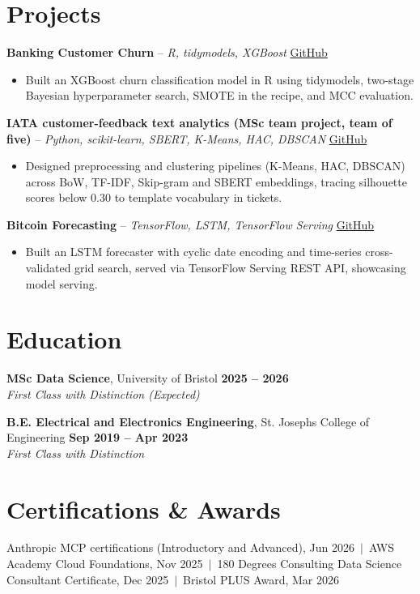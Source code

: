 \documentclass[a4paper,11pt]{article}
\begin{document}
\section{Projects}
\noindent\textbf{Banking Customer Churn} -- \textit{R, tidymodels, XGBoost} \hfill \href{https://github.com/Thiruvel-AP/Banking-Customer-Churn-Prediction}{GitHub}
\begin{itemize}
  \item Built an XGBoost churn classification model in R using tidymodels, two-stage Bayesian hyperparameter search, SMOTE in the recipe, and MCC evaluation.
\end{itemize}
\vspace{3pt}
\noindent\textbf{IATA customer-feedback text analytics (MSc team project, team of five)} -- \textit{Python, scikit-learn, SBERT, K-Means, HAC, DBSCAN} \hfill \href{https://github.com/Thiruvel-AP/TextAnalytics}{GitHub}
\begin{itemize}
  \item Designed preprocessing and clustering pipelines (K-Means, HAC, DBSCAN) across BoW, TF-IDF, Skip-gram and SBERT embeddings, tracing silhouette scores below 0.30 to template vocabulary in tickets.
\end{itemize}
\vspace{3pt}
\noindent\textbf{Bitcoin Forecasting} -- \textit{TensorFlow, LSTM, TensorFlow Serving} \hfill \href{https://github.com/Thiruvel-AP/BitcoinForecasting}{GitHub}
\begin{itemize}
  \item Built an LSTM forecaster with cyclic date encoding and time-series cross-validated grid search, served via TensorFlow Serving REST API, showcasing model serving.
\end{itemize}

\section{Education}
\textbf{MSc Data Science}, University of Bristol \hfill \textbf{2025 – 2026}\\ \textit{First Class with Distinction (Expected)}\par
\vspace{3pt}
\textbf{B.E. Electrical and Electronics Engineering}, St. Joseph\textquotesingle{}s College of Engineering \hfill \textbf{Sep 2019 – Apr 2023}\\ \textit{First Class with Distinction}\par

\section{Certifications \& Awards}
Anthropic MCP certifications (Introductory and Advanced), Jun 2026 \,$|$\, AWS Academy Cloud Foundations, Nov 2025 \,$|$\, 180 Degrees Consulting Data Science Consultant Certificate, Dec 2025 \,$|$\, Bristol PLUS Award, Mar 2026
\end{document}

